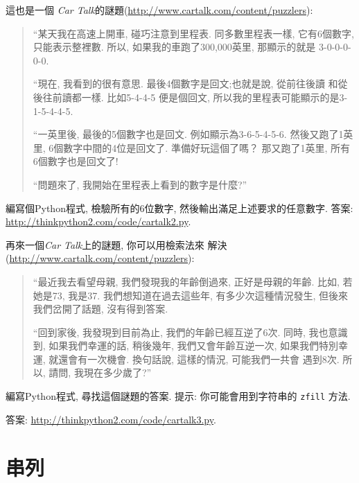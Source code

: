\documentclass[10pt]{book}
\begin{document}
\begin{exercise}
這也是一個 {\em Car Talk}的謎題(\url{http://www.cartalk.com/content/puzzlers}):

\begin{quote}

``某天我在高速上開車, 碰巧注意到里程表. 
同多數里程表一樣, 它有6個數字, 只能表示整裡數. 
所以, 如果我的車跑了300,000英里, 那顯示的就是
3-0-0-0-0-0.

``現在, 我看到的很有意思. 最後4個數字是回文;也就是說, 從前往後讀
和從後往前讀都一樣. 比如5-4-4-5 便是個回文, 
所以我的里程表可能顯示的是3-1-5-4-4-5.

``一英里後, 最後的5個數字也是回文. 
例如顯示為3-6-5-4-5-6. 然後又跑了1英里, 6個數字中間的4位是回文了. 
準備好玩這個了嗎？ 那又跑了1英里, 所有6個數字也是回文了!

``問題來了, 我開始在里程表上看到的數字是什麼?''
\end{quote}

編寫個Python程式, 檢驗所有的6位數字, 然後輸出滿足上述要求的任意數字. 
答案: \url{http://thinkpython2.com/code/cartalk2.py}.

\end{exercise}


\begin{exercise}
再來一個{\em Car Talk}上的謎題, 你可以用檢索法來
解決(\url{http://www.cartalk.com/content/puzzlers}):

\begin{quote}
``最近我去看望母親, 我們發現我的年齡倒過來, 正好是母親的年齡. 
比如, 若她是73, 我是37. 我們想知道在過去這些年, 有多少次這種情況發生, 
但後來我們岔開了話題, 沒有得到答案. 

``回到家後, 我發現到目前為止, 我們的年齡已經互逆了6次. 
同時, 我也意識到, 如果我們幸運的話, 稍後幾年, 我們又會年齡互逆一次, 
如果我們特別幸運, 就還會有一次機會. 換句話說, 這樣的情況, 可能我們一共會
遇到8次. 所以, 請問, 我現在多少歲了?''

\end{quote}

編寫Python程式, 尋找這個謎題的答案. 
提示: 你可能會用到字符串的 {\tt zfill} 方法. 

答案: \url{http://thinkpython2.com/code/cartalk3.py}.

\end{exercise}



\chapter{串列}
\end{document}

